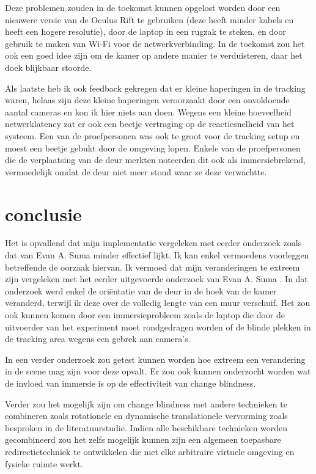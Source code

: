 Deze problemen zouden in de toekomst kunnen opgelost worden door een nieuwere
versie van de Oculus Rift te gebruiken (deze heeft minder kabels en heeft een
hogere resolutie), door de laptop in een rugzak te steken, en door gebruik te 
maken van Wi-Fi voor de netwerkverbinding. In de toekomst zou het ook een goed 
idee zijn om de kamer op andere manier te verduisteren, daar het doek blijkbaar 
stoorde.

Als laatste heb ik ook feedback gekregen dat er kleine haperingen in de tracking
waren, helaas zijn deze kleine haperingen veroorzaakt door een onvoldoende aantal
cameras en kon ik hier niets aan doen. Wegens een kleine hoeveelheid 
netwerklatency zat er ook een beetje vertraging op de reactiesnelheid van het 
systeem. Een van de proefpersonen was ook te groot voor de tracking setup en 
moest een beetje gebukt door de omgeving lopen. Enkele van de proefpersonen die 
de verplaatsing van de deur merkten noteerden dit ook als immersiebrekend, 
vermoedelijk omdat de deur niet meer stond waar ze deze verwachtte.


\section{conclusie}
Het is opvallend dat mijn implementatie vergeleken met eerder onderzoek zoals dat 
van Evan A. Suma \cite{suma11} minder effectief lijkt. Ik kan enkel vermoedens
voorleggen betreffende de oorzaak hiervan. Ik vermoed dat mijn veranderingen te 
extreem zijn vergeleken met het eerder uitgevoerde onderzoek van Evan A. Suma 
\cite{suma11}. In dat onderzoek werd enkel de ori\"entatie van de deur in de hoek 
van de kamer veranderd, terwijl ik deze over de volledig lengte van een muur 
verschuif. Het zou ook kunnen komen door een immersieprobleem zoals de laptop 
die door de uitvoerder van het experiment moet rondgedragen worden of de blinde 
plekken in de tracking area wegens een gebrek aan camera's.

In een verder onderzoek zou getest kunnen worden hoe extreem een verandering in
de scene mag zijn voor deze opvalt. Er zou ook kunnen onderzocht worden wat de
invloed van immersie is op de effectiviteit van change blindness.

Verder zou het mogelijk zijn om change blindness met andere technieken te
combineren zoals rotationele en dynamische translationele vervorming zoals
besproken in de literatuurstudie. Indien alle beschikbare technieken worden 
gecombineerd zou het zelfs mogelijk kunnen zijn een algemeen toepasbare 
redirectietechniek te ontwikkelen die met elke arbitraire virtuele omgeving en 
fysieke ruimte werkt.